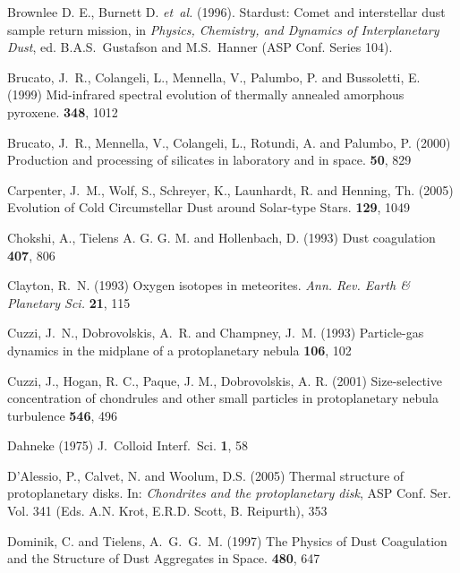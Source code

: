 \begin{literature}
\item
Brownlee D. E., Burnett D. {\em et~al.} (1996).  Stardust: Comet and
interstellar dust sample return mission, in \textit{Physics, Chemistry,
and Dynamics of Interplanetary Dust}, ed. B.A.S.~Gustafson and
M.S.~Hanner (ASP Conf. Series 104).

\item 
Brucato, J.~R., Colangeli, L., Mennella, V., Palumbo, P. and Bussoletti, E.
(1999) Mid-infrared spectral evolution of thermally annealed amorphous
pyroxene. \aap \textbf{348}, 1012

\item 
Brucato, J.~R., Mennella, V., Colangeli, L., Rotundi, A. and Palumbo,
P. (2000) Production and processing of silicates in laboratory and in
space. \pss \textbf{50}, 829

\item 
Carpenter, J.~M., Wolf, S., Schreyer, K., Launhardt, R. and Henning,
Th. (2005) Evolution of Cold Circumstellar Dust around Solar-type Stars. \aj
\textbf{129}, 1049

\item 
Chokshi, A.,  Tielens A. G. G. M. and Hollenbach, D. (1993)
Dust coagulation \apj \textbf{407}, 806 

\item 
Clayton, R.~N. (1993) Oxygen isotopes in meteorites. \textit{Ann. Rev. Earth
\& Planetary Sci.} \textbf{21}, 115

\item 
Cuzzi, J.~N., Dobrovolskis, A.~R. and Champney, J.~M. (1993) 
Particle-gas dynamics in the midplane of a protoplanetary nebula
\ica \textbf{106}, 102

\item 
Cuzzi, J., Hogan, R. C., Paque, J. M., Dobrovolskis, A. R. (2001)
Size-selective concentration of chondrules and other small particles in
protoplanetary nebula turbulence \apj \textbf{546}, 496

\item 
Dahneke (1975)   J.~Colloid Interf.~Sci. \textbf{1}, 58 

\item D'Alessio, P., Calvet, N. and Woolum, D.S. (2005) Thermal structure of
  protoplanetary disks. In: \textit{Chondrites and the protoplanetary disk\/},
  ASP Conf. Ser. Vol. 341 (Eds. A.N. Krot, E.R.D. Scott, B. Reipurth), 353

\item 
Dominik, C. and Tielens, A.~G.~G.~M. (1997) The Physics of Dust Coagulation
and the Structure of Dust Aggregates in Space. \ica \textbf{480}, 647


\end{literature}

